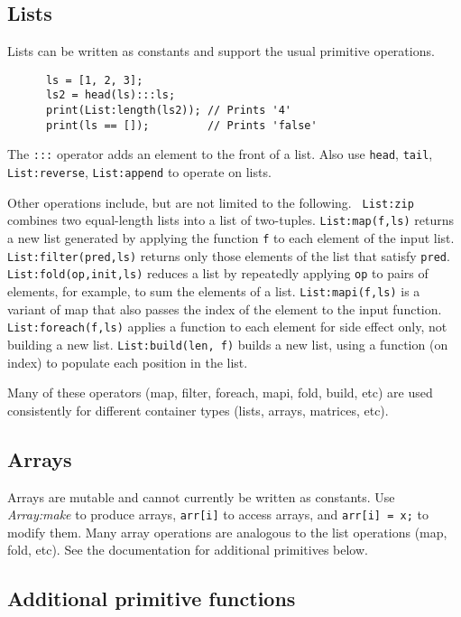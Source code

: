 \documentclass[twocolumn]{report}
\begin{document}
\subsection{Lists}

Lists can be written as constants and support the usual primitive
operations.  
\begin{verbatim}
      ls = [1, 2, 3];
      ls2 = head(ls):::ls;
      print(List:length(ls2)); // Prints '4'
      print(ls == []);         // Prints 'false'
\end{verbatim}

The {\tt :::} operator adds an element to the front of a list.  Also
use {\tt head}, {\tt tail}, {\tt List:reverse}, {\tt List:append} to operate on
lists.  

Other operations include, but are not limited to the following. {\tt
List:zip} combines two equal-length lists into a list of two-tuples.
{\tt List:map(f,ls)} returns a new list generated by applying the
function {\tt f} to each element of the input list.  {\tt
List:filter(pred,ls)} returns only those elements of the list that
satisfy {\tt pred}.  {\tt List:fold(op,init,ls)} reduces a list by
repeatedly applying {\tt op} to pairs of elements, for example, to sum
the elements of a list.  {\tt List:mapi(f,ls)} is a variant of map
that also passes the index of the element to the input function.  {\tt
List:foreach(f,ls)} applies a function to each element for side effect
only, not building a new list.  {\tt List:build(len, f)} builds a new
list, using a function (on index) to populate each position in the
list.

Many of these operators (map, filter, foreach, mapi, fold, build, etc) are used consistently
for different container types (lists, arrays, matrices, etc).

\subsection{Arrays}

Arrays are mutable and cannot currently be written as constants.  Use
{\em Array:make} to produce arrays, {\tt arr[i]} to access arrays, and
{\tt arr[i] = x;} to modify them.  Many array operations are analogous
to the list operations (map, fold, etc).  See the documentation for
additional primitives below.


\subsection{Additional primitive functions}
\end{document}
